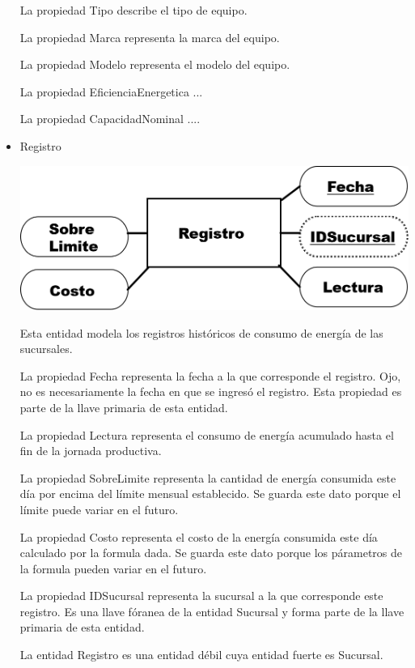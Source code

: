 \documentclass{article}
\begin{document}
\begin{itemize}
La propiedad Tipo describe el tipo de equipo.

La propiedad Marca representa la marca del equipo.

La propiedad Modelo representa el modelo del equipo.

La propiedad EficienciaEnergetica ...

La propiedad CapacidadNominal ....

\item Registro

\includegraphics[scale=0.5]{Imagenes/Informe1/EntidadRegistro.png}

Esta entidad modela los registros históricos de consumo de energía de las sucursales.

La propiedad Fecha representa la fecha a la que corresponde el registro. Ojo, no es necesariamente la fecha en que se ingresó el registro. Esta propiedad es parte de la llave primaria de esta entidad.

La propiedad Lectura representa el consumo de energía acumulado hasta el fin de la jornada productiva.

La propiedad SobreLimite representa la cantidad de energía consumida este día por encima del límite mensual establecido. Se guarda este dato porque el límite puede variar en el futuro.

La propiedad Costo representa el costo de la energía consumida este día calculado por la formula dada. Se guarda este dato porque los párametros de la formula pueden variar en el futuro.

La propiedad IDSucursal representa la sucursal a la que corresponde este registro. Es una llave fóranea de la entidad Sucursal y forma parte de la llave primaria de esta entidad.

La entidad Registro es una entidad débil cuya entidad fuerte es Sucursal.
\end{itemize}
\end{document}
